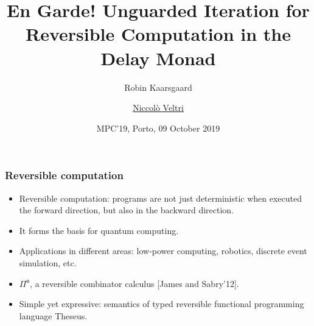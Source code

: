 \documentclass[12pt,t]{beamer}
\newcommand{\Pio}{\ensuremath{\mathsf{\Pi}^{\mathsf{o}}}}
\begin{document}

\title{En Garde! Unguarded Iteration for Reversible Computation in the
  Delay Monad}


\author{Robin Kaarsgaard  \and \underline{Niccol\`o Veltri} }
\date{MPC'19, Porto, 09 October 2019}

\begin{frame}

\maketitle

\end{frame}


\begin{frame}

  \frametitle{Reversible computation}

  \begin{itemize}

  \item Reversible computation: programs are not just deterministic when
    executed the forward direction, but also in the
    backward direction.
  \item It forms the basis for quantum computing.
  \item Applications in different areas: low-power computing, robotics,
    discrete event simulation, etc.

    \pause
    \vspace{\fill}
    
  \item \Pio, a reversible combinator calculus [James and Sabry'12].
  \item Simple yet expressive: semantics of typed reversible
    functional programming language Theseus.
  \end{itemize}

\end{frame}
\end{document}
